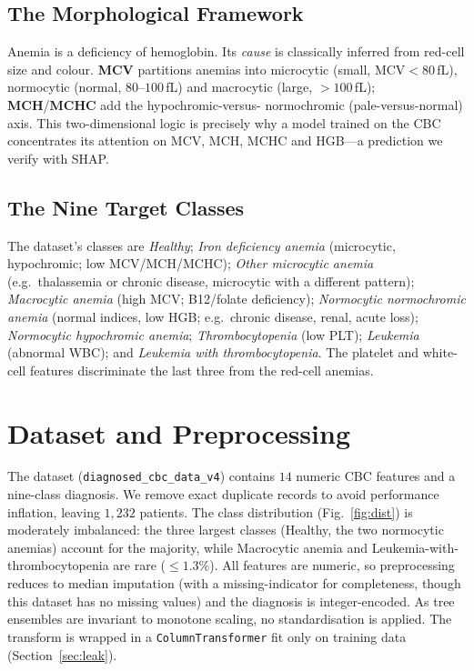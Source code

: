 \documentclass[conference]{IEEEtran}
\begin{document}
\subsection{The Morphological Framework}
Anemia is a deficiency of hemoglobin. Its \emph{cause} is classically inferred from
red-cell size and colour. \textbf{MCV} partitions anemias into microcytic
(small, MCV${<}80$\,fL), normocytic (normal, $80$--$100$\,fL) and macrocytic
(large, ${>}100$\,fL); \textbf{MCH}/\textbf{MCHC} add the hypochromic-versus-
normochromic (pale-versus-normal) axis. This two-dimensional logic is precisely why
a model trained on the CBC concentrates its attention on MCV, MCH, MCHC and HGB---a
prediction we verify with SHAP.

\subsection{The Nine Target Classes}
The dataset's classes are \textit{Healthy}; \textit{Iron deficiency anemia}
(microcytic, hypochromic; low MCV/MCH/MCHC); \textit{Other microcytic anemia}
(e.g.\ thalassemia or chronic disease, microcytic with a different pattern);
\textit{Macrocytic anemia} (high MCV; B12/folate deficiency); \textit{Normocytic
normochromic anemia} (normal indices, low HGB; e.g.\ chronic disease, renal,
acute loss); \textit{Normocytic hypochromic anemia}; \textit{Thrombocytopenia}
(low PLT); \textit{Leukemia} (abnormal WBC); and \textit{Leukemia with
thrombocytopenia}. The platelet and white-cell features discriminate the last
three from the red-cell anemias.

\section{Dataset and Preprocessing}
The dataset (\texttt{diagnosed\_cbc\_data\_v4}) contains $14$ numeric CBC features
and a nine-class diagnosis. We remove exact duplicate records to avoid
performance inflation, leaving $1{,}232$ patients. The
class distribution (Fig.~\ref{fig:dist}) is moderately imbalanced: the three
largest classes (Healthy, the two normocytic anemias) account for the majority,
while Macrocytic anemia and Leukemia-with-thrombocytopenia are rare ($\leq1.3\%$).
All features are numeric, so preprocessing reduces to median imputation (with a
missing-indicator for completeness, though this dataset has no missing values) and
the diagnosis is integer-encoded. As tree ensembles are invariant to monotone
scaling, no standardisation is applied. The transform is wrapped in a
\texttt{ColumnTransformer} fit only on training data (Section~\ref{sec:leak}).
\end{document}
